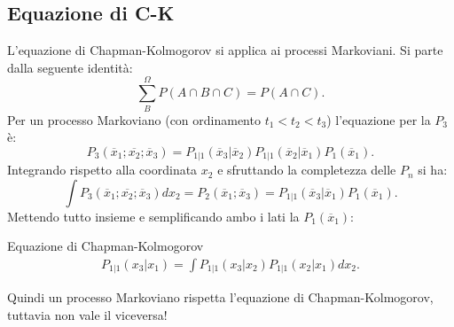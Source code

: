 \subsection{Equazione di C-K}%
\label{sub:Equazione di Chapman-Kolmogorov}
L'equazione di Chapman-Kolmogorov si applica ai processi Markoviani. Si parte dalla seguente identità:
\[
    \sum_{B}^{\Omega} P(A \cap B \cap C) = P(A \cap C) 
.\] 
Per un processo Markoviano (con ordinamento $t_1 < t_2 < t_3$) l'equazione per la $P_3$ è:
\[
    P_3(\overline{x}_1; \overline{x_2}; \overline{x}_3) = P_{1|1}(\overline{x}_3| \overline{x}_2) P_{1|1}(\overline{x}_2 | \overline{x}_1) 
    P_1(\overline{x}_1) 
.\] 
Integrando rispetto alla coordinata $x_2$ e sfruttando la completezza delle $P_n$ si ha:
\[
    \int P_3(\overline{x}_1; \overline{x_2}; \overline{x}_3) dx_2 = P_2(\overline{x}_1;\overline{x}_3) = P_{1|1}(\overline{x}_3|\overline{x}_1) P_1(\overline{x}_1)
.\] 
Mettendo tutto insieme e semplificando ambo i lati la $P_1(\overline{x}_1)$:
\begin{redbox}{Equazione di Chapman-Kolmogorov}
    \[\begin{aligned}
	P_{1|1}(x_3|x_1) = \int P_{1|1}(x_3|x_2) P_{1|1}(x_2|x_1)dx_2 \label{eq:3_CK}
    .\end{aligned}\]
\end{redbox}
\noindent
Quindi un processo Markoviano rispetta l'equazione di Chapman-Kolmogorov, tuttavia non vale il viceversa!
